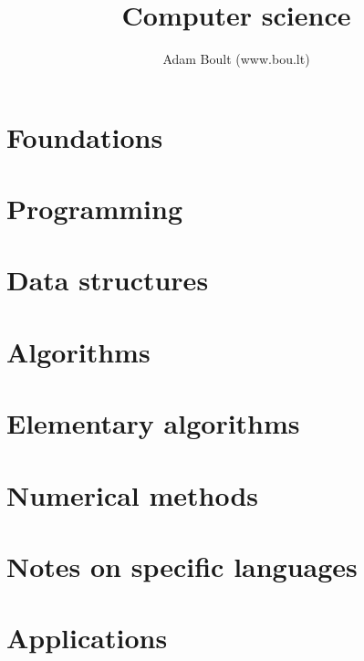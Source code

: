 \documentclass[oneside]{book}
\begin{document}
\author{Adam Boult (www.bou.lt)}
\title{Computer science}
\maketitle

\setcounter{tocdepth}{1}
\tableofcontents



\part{Foundations}





\part{Programming}




\part{Data structures}





\part{Algorithms}



\part{Elementary algorithms}



\part{Numerical methods}









\part{Notes on specific languages}	







\part{Applications}



\end{document}
